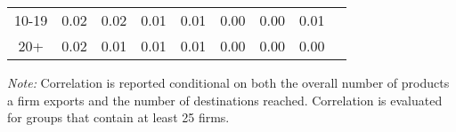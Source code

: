 \documentclass{article}
\begin{document}
\begin{table}[h]
{\begin{threeparttable}
\begin{tabular}{cllllllll}
10-19                                      & 0.02     & 0.02    & 0.01 & 0.01 & 0.00 & 0.00  & 0.01 \\
20+                                            & 0.02     & 0.01    & 0.01 & 0.01 & 0.00 & 0.00  & 0.00 \\
\hline\hline
\end{tabular}
\begin{tablenotes}
\small
\item  \noindent  \footnotesize{\emph{Note:} Correlation is reported conditional on both the overall number of products a firm exports and the number of destinations reached. Correlation is evaluated for groups that contain at least 25 firms. }
\end{tablenotes}
\end{threeparttable}
}
\end{table}
\end{document}
